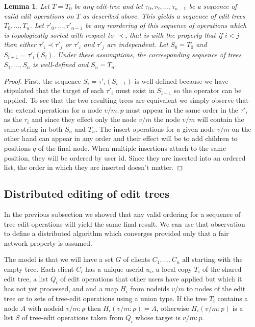 \documentclass{amsart}
\newtheorem{lemma}[theorem]{Lemma}
\begin{document}
\begin{lemma}
Let $T=T_0$ be any edit-tree and let $\tau_0,\tau_2,\ldots,\tau_{n-1}$
be a sequence of valid edit operations on $T$ as described above.
This yields a sequence of edit trees $T_0,\ldots,T_n$. Let 
$\tau'_0,\ldots,\tau'_{n-1}$ be any reordering of this sequence of operations
which is topologically sorted with respect to $\prec$, that is
with the property that if $i<j$ then either $\tau'_i\prec\tau'_j$ or
$\tau'_i$ and $\tau'_j$ are independent. Let $S_0=T_0$ and $S_{i+1} = \tau'_i(S_i)$.
Under these assumptions, the corresponding sequence of trees
$S_1,\ldots,S_n$ is well-defined and $S_n=T_n$.
\end{lemma}

\begin{proof}
First, the sequence $S_{i}=\tau'_i(S_{i-1})$ is well-defined because we have
stipulated that the target of each $\tau'_i$ must exist in $S_{i-1}$ so the
operator can be applied. To see that the two resulting trees are equivalent
we simply observe that the extend operations for a node $v/m:p$ must appear
in the same order in the $\tau'_i$ as the $\tau_i$ and since they effect only
the node $v/m$ the node $v/m$ will contain the same string in both $S_n$ and $T_n$.
The insert operations for a given node $v/m$ on the other hand can appear
in any order and their effect will be to add children to positions $q$
of the final node. When multiple insertions attach to the same position, they
will be ordered by user id. Since they are inserted into an ordered list,
the order in which they are inserted doesn't matter.
\end{proof}

\subsection{Distributed editing of edit trees}
In the previous subsection we showed that any valid ordering for a sequence
of tree edit operations will yield the same final result. We can use that
observation to define a distributed algorithm which converges provided only
that a fair network property is assumed.

The model is that we will have a set $G$ of clients $C_1,\ldots,C_n$
all starting with the empty tree. Each client $C_i$ has a unique userid $u_i$,
a local copy $T_i$ of the shared edit tree,
a list $Q_i$ of edit operations that other users have applied but which it
has not yet processed, and
and a map $H_i$ from nodeids $v/m$ to nodes of the edit tree or to sets of tree-edit operations using a union type. If the tree $T_i$ contains a node $A$ with nodeid $v/m:p$ then $H_i(v/m:p)=A$, otherwise $H_i(v/m:p)$ is a list $S$ of tree-edit operations taken from $Q_i$ whose target is $v/m:p$.
\end{document}
